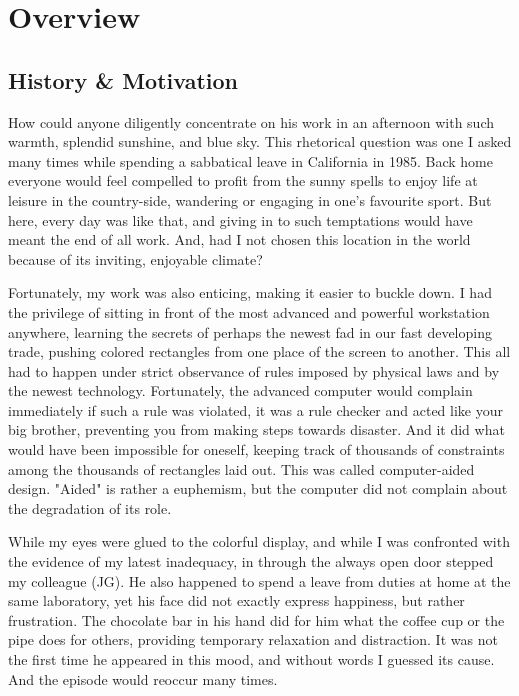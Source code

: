 \chapter{Overview}
\section{History \& Motivation}
How could anyone diligently concentrate on his work in an afternoon with such warmth, splendid
sunshine, and blue sky. This rhetorical question was one I asked many times while spending a
sabbatical leave in California in 1985. Back home everyone would feel compelled to profit from the
sunny spells to enjoy life at leisure in the country-side, wandering or engaging in one's favourite
sport. But here, every day was like that, and giving in to such temptations would have meant the
end of all work. And, had I not chosen this location in the world because of its inviting, enjoyable climate?

Fortunately, my work was also enticing, making it easier to buckle down. I had the privilege of
sitting in front of the most advanced and powerful workstation anywhere, learning the secrets of
perhaps the newest fad in our fast developing trade, pushing colored rectangles from one place of
the screen to another. This all had to happen under strict observance of rules imposed by physical
laws and by the newest technology. Fortunately, the advanced computer would complain
immediately if such a rule was violated, it was a rule checker and acted like your big brother,
preventing you from making steps towards disaster. And it did what would have been impossible for
oneself, keeping track of thousands of constraints among the thousands of rectangles laid out. This
was called computer-aided design. "Aided" is rather a euphemism, but the computer did not
complain about the degradation of its role.

While my eyes were glued to the colorful display, and while I was confronted with the evidence of
my latest inadequacy, in through the always open door stepped my colleague (JG). He also
happened to spend a leave from duties at home at the same laboratory, yet his face did not exactly
express happiness, but rather frustration. The chocolate bar in his hand did for him what the coffee
cup or the pipe does for others, providing temporary relaxation and distraction. It was not the first
time he appeared in this mood, and without words I guessed its cause. And the episode would
reoccur many times.

